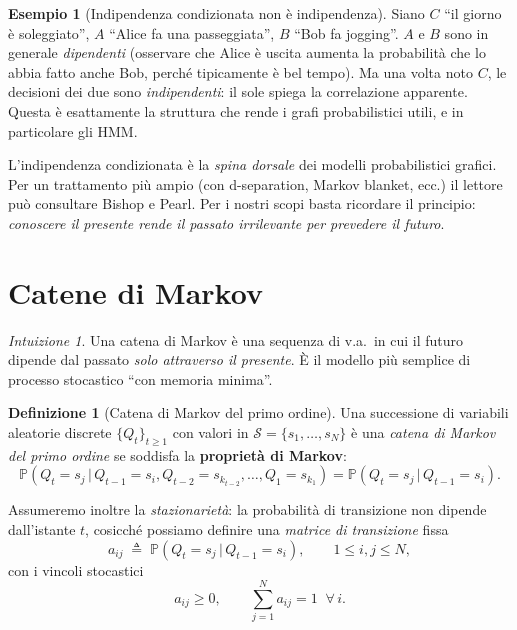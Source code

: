 \documentclass[11pt,a4paper,oneside]{book}
\theoremstyle{plain}
\theoremstyle{definition}
\newtheorem{definizione}[teorema]{Definizione}
\newtheorem{esempio}[teorema]{Esempio}
\theoremstyle{remark}
\newtheorem*{intuizione}{Intuizione}
\newcommand{\Prob}{\mathbb{P}}
\newcommand{\states}{\mathcal{S}}            %
\newcommand{\Nstates}{N}                     %
\newcommand{\given}{\,\vert\,}
\begin{document}
\begin{esempio}[Indipendenza condizionata non è indipendenza]
Siano $C$ ``il giorno è soleggiato'', $A$ ``Alice fa una passeggiata'',
$B$ ``Bob fa jogging''. $A$ e $B$ sono in generale \emph{dipendenti}
(osservare che Alice è uscita aumenta la probabilità che lo abbia
fatto anche Bob, perché tipicamente è bel tempo). Ma una volta noto
$C$, le decisioni dei due sono \emph{indipendenti}: il sole spiega
la correlazione apparente. Questa è esattamente la struttura che
rende i grafi probabilistici utili, e in particolare gli HMM.
\end{esempio}

L'indipendenza condizionata è la \emph{spina dorsale} dei modelli
probabilistici grafici. Per un trattamento più ampio (con d-separation,
Markov blanket, ecc.) il lettore può consultare Bishop e Pearl. Per i
nostri scopi basta ricordare il principio: \emph{conoscere il presente
rende il passato irrilevante per prevedere il futuro}.

\section{Catene di Markov}

\begin{intuizione}
Una catena di Markov è una sequenza di v.a.\ in cui il futuro dipende
dal passato \emph{solo attraverso il presente}. È il modello più
semplice di processo stocastico ``con memoria minima''.
\end{intuizione}

\begin{definizione}[Catena di Markov del primo ordine]
Una successione di variabili aleatorie discrete $\{Q_t\}_{t\ge 1}$
con valori in $\states=\{s_1,\dots,s_{\Nstates}\}$ è una
\emph{catena di Markov del primo ordine} se soddisfa la
\textbf{proprietà di Markov}:
\begin{equation}
    \Prob(Q_t = s_j \given Q_{t-1}=s_i, Q_{t-2}=s_{k_{t-2}},\dots,Q_1=s_{k_1})
    = \Prob(Q_t = s_j \given Q_{t-1}=s_i).
    \label{eq:markov_prop}
\end{equation}
\end{definizione}

Assumeremo inoltre la \emph{stazionarietà}: la probabilità di
transizione non dipende dall'istante $t$, cosicché possiamo definire
una \emph{matrice di transizione} fissa
\begin{equation}
    a_{ij} \;\triangleq\; \Prob(Q_t = s_j \given Q_{t-1}=s_i),
    \qquad 1\le i,j \le \Nstates,
    \label{eq:transition_def}
\end{equation}
con i vincoli stocastici
\begin{equation}
    a_{ij}\ge 0,\qquad \sum_{j=1}^{\Nstates} a_{ij} = 1
    \;\;\forall\, i.
    \label{eq:stoc_constraints}
\end{equation}
\end{document}
